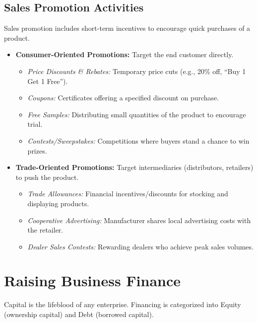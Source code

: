 \documentclass[12pt,a4paper]{article}
\begin{document}
\subsection{Sales Promotion Activities}
Sales promotion includes short-term incentives to encourage quick purchases of a product.
\begin{itemize}[leftmargin=*, itemsep=3.5pt]
  \item \textbf{Consumer-Oriented Promotions:} Target the end customer directly.
    \begin{itemize}[label=\tiny$\bullet$, leftmargin=1.5em, itemsep=2pt]
      \item \textit{Price Discounts \& Rebates:} Temporary price cuts (e.g., 20\% off, ``Buy 1 Get 1 Free'').
      \item \textit{Coupons:} Certificates offering a specified discount on purchase.
      \item \textit{Free Samples:} Distributing small quantities of the product to encourage trial.
      \item \textit{Contests/Sweepstakes:} Competitions where buyers stand a chance to win prizes.
    \end{itemize}
  \item \textbf{Trade-Oriented Promotions:} Target intermediaries (distributors, retailers) to push the product.
    \begin{itemize}[label=\tiny$\bullet$, leftmargin=1.5em, itemsep=2pt]
      \item \textit{Trade Allowances:} Financial incentives/discounts for stocking and displaying products.
      \item \textit{Cooperative Advertising:} Manufacturer shares local advertising costs with the retailer.
      \item \textit{Dealer Sales Contests:} Rewarding dealers who achieve peak sales volumes.
    \end{itemize}
\end{itemize}

\section{Raising Business Finance}

Capital is the lifeblood of any enterprise. Financing is categorized into Equity (ownership capital) and Debt (borrowed capital).
\end{document}
